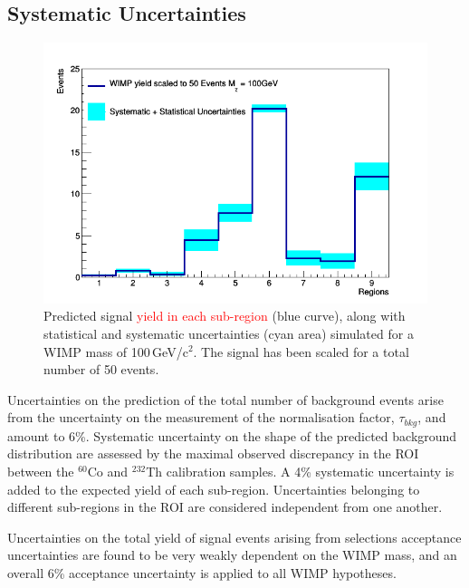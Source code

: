 


\subsection{Systematic Uncertainties}

\begin{figure}[t!]
  \includegraphics[width=\linewidth]{images/wimp_sys_unc.png}
\caption{Predicted signal \textcolor{red} {yield in each sub-region} (blue curve), along with statistical and systematic uncertainties (cyan area) simulated for a WIMP mass of 100\,GeV/c$^2$.  The signal has been scaled for a total number of 50 events.}
  \label{fig:unc}
\end{figure}


Uncertainties on the  prediction of the total number of background events arise from the uncertainty on the measurement of the normalisation 
factor, $\tau_{bkg}$, and amount to 6\%. %
Systematic uncertainty on the shape of the predicted background distribution are assessed by the maximal observed discrepancy in the ROI between
the $^{60}$Co and $^{232}$Th calibration samples.  
 A 4\% systematic uncertainty is added  to the expected yield of each sub-region.
Uncertainties belonging to different sub-regions in the ROI are considered independent from one another.

Uncertainties on the total yield of signal events arising from selections acceptance uncertainties are found to be very weakly dependent on 
the WIMP mass, and an overall 6\% acceptance uncertainty is applied to all WIMP hypotheses. 

